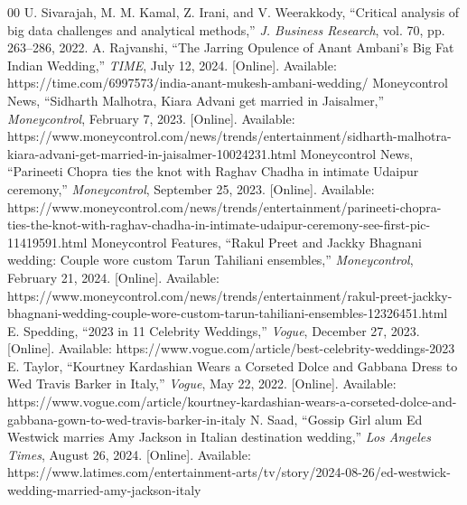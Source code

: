 \documentclass[conference]{IEEEtran}
\begin{document}
\begin{thebibliography}{00}
 U. Sivarajah, M. M. Kamal, Z. Irani, and V. Weerakkody, ``Critical analysis of big data challenges and analytical methods,'' \textit{J. Business Research}, vol. 70, pp. 263--286, 2022.
 A. Rajvanshi, ``The Jarring Opulence of Anant Ambani's Big Fat Indian Wedding,'' \textit{TIME}, July 12, 2024. [Online]. Available: https://time.com/6997573/india-anant-mukesh-ambani-wedding/
 Moneycontrol News, ``Sidharth Malhotra, Kiara Advani get married in Jaisalmer,'' \textit{Moneycontrol}, February 7, 2023. [Online]. Available: https://www.moneycontrol.com/news/trends/entertainment/sidharth-malhotra-kiara-advani-get-married-in-jaisalmer-10024231.html
 Moneycontrol News, ``Parineeti Chopra ties the knot with Raghav Chadha in intimate Udaipur ceremony,'' \textit{Moneycontrol}, September 25, 2023. [Online]. Available: https://www.moneycontrol.com/news/trends/entertainment/parineeti-chopra-ties-the-knot-with-raghav-chadha-in-intimate-udaipur-ceremony-see-first-pic-11419591.html
 Moneycontrol Features, ``Rakul Preet and Jackky Bhagnani wedding: Couple wore custom Tarun Tahiliani ensembles,'' \textit{Moneycontrol}, February 21, 2024. [Online]. Available: https://www.moneycontrol.com/news/trends/entertainment/rakul-preet-jackky-bhagnani-wedding-couple-wore-custom-tarun-tahiliani-ensembles-12326451.html
 E. Spedding, ``2023 in 11 Celebrity Weddings,'' \textit{Vogue}, December 27, 2023. [Online]. Available: https://www.vogue.com/article/best-celebrity-weddings-2023
 E. Taylor, ``Kourtney Kardashian Wears a Corseted Dolce and Gabbana Dress to Wed Travis Barker in Italy,'' \textit{Vogue}, May 22, 2022. [Online]. Available: https://www.vogue.com/article/kourtney-kardashian-wears-a-corseted-dolce-and-gabbana-gown-to-wed-travis-barker-in-italy
 N. Saad, ``Gossip Girl alum Ed Westwick marries Amy Jackson in Italian destination wedding,'' \textit{Los Angeles Times}, August 26, 2024. [Online]. Available: https://www.latimes.com/entertainment-arts/tv/story/2024-08-26/ed-westwick-wedding-married-amy-jackson-italy
\end{thebibliography}
\end{document}

